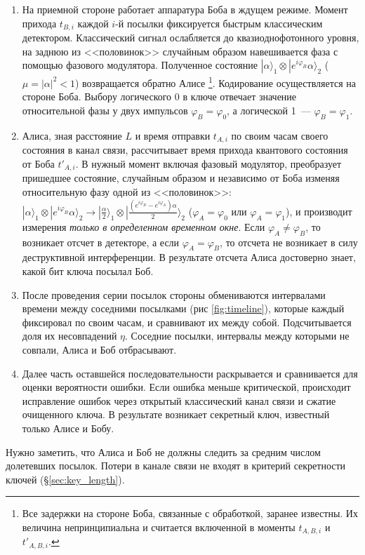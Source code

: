 \begin{enumerate}
  \item На приемной стороне работает аппаратура Боба в ждущем режиме. Момент прихода $t_{B,i}$ каждой $i$-й посылки фиксируется быстрым классическим детектором. 
  Классический сигнал ослабляется до квазиоднофотонного уровня, на заднюю из <<половинок>> случайным образом навешивается фаза с помощью фазового модулятора. 
  Полученное состояние $|\alpha\rangle_1 \otimes |e^{i\varphi_B}\alpha\rangle_2$ ($\mu = |\alpha|^2 < 1$) возвращается обратно Алисе 
  \footnote{Все задержки на стороне Боба, связанные с обработкой, заранее известны. Их величина непринципиальна и считается включенной в моменты $t_{A,B,i}$ и $t'_{A,B,i}$.}. 
  Кодирование осуществляется на стороне Боба.
  Выбору логического 0 в ключе отвечает значение относительной фазы у двух импульсов $\varphi_B = \varphi_0$, а логической 1~--- $\varphi_B = \varphi_1$.   
  
  \item Алиса, зная расстояние $L$ и время отправки $t_{A,i}$ по своим часам своего состояния в канал связи, рассчитывает время прихода квантового состояния от Боба $t'_{A,i}$.
  В нужный момент включая фазовый модулятор, преобразует пришедшее состояние, случайным образом и независимо от Боба изменяя относительную фазу одной из <<половинок>>: 
  $|\alpha\rangle_1 \otimes |e^{i\varphi_B}\alpha\rangle_2 \rightarrow |\frac{\alpha}{2}\rangle_1 \otimes |\frac{(e^{i\varphi_B} - e^{i\varphi_A})\alpha}{2}\rangle_2$
  ($\varphi_A = \varphi_0$ или $\varphi_A = \varphi_1$), и производит измерения \textit{только в определенном временном окне}. 
  Если $\varphi_A \neq \varphi_B$, то возникает отсчет в детекторе, а если $\varphi_A = \varphi_B$, то отсчета не возникает в силу деструктивной интерференции. В результате отсчета Алиса достоверно знает, какой бит ключа посылал Боб.
  
  \item После проведения серии посылок стороны обмениваются интервалами времени между соседними посылками (рис \ref{fig:timeline}), которые каждый фиксировал по своим часам, и сравнивают их между собой. Подсчитывается доля их несовпадений $\eta$. Соседние посылки, интервалы между которыми не совпали, Алиса и Боб отбрасывают.
  
  \item Далее часть оставшейся последовательности раскрывается и сравнивается для оценки вероятности ошибки. Если ошибка меньше критической, происходит исправление ошибок через открытый классический канал связи и сжатие очищенного ключа. В результате возникает секретный ключ, известный только Алисе и Бобу.
\end{enumerate}

Нужно заметить, что Алиса и Боб не должны следить за средним числом долетевших посылок. Потери в канале связи не входят в критерий секретности ключей (\S\ref{sec:key_length}).
\clearpage
